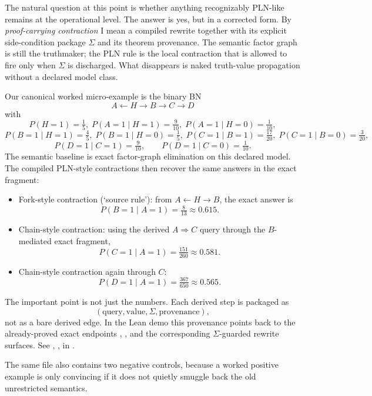 \documentclass[11pt,openany]{report}
\begin{document}
The natural question at this point is whether anything recognizably
PLN-like remains at the operational level.  The answer is yes, but in a
corrected form.  By \emph{proof-carrying contraction} I mean a compiled
rewrite together with its explicit side-condition package $\Sigma$ and
its theorem provenance.  The semantic factor graph is still the
truthmaker; the PLN rule is the local contraction that is allowed to fire
only when $\Sigma$ is discharged.  What disappears is naked truth-value
propagation without a declared model class.

Our canonical worked micro-example is the binary BN
\[
  A \leftarrow H \to B \to C \to D
\]
with
\[
  P(H{=}1)=\tfrac15,\;
  P(A{=}1 \mid H{=}1)=\tfrac9{10},\;
  P(A{=}1 \mid H{=}0)=\tfrac1{10},
\]
\[
  P(B{=}1 \mid H{=}1)=\tfrac45,\;
  P(B{=}1 \mid H{=}0)=\tfrac15,\;
  P(C{=}1 \mid B{=}1)=\tfrac{17}{20},\;
  P(C{=}1 \mid B{=}0)=\tfrac3{20},
\]
\[
  P(D{=}1 \mid C{=}1)=\tfrac9{10},\qquad
  P(D{=}1 \mid C{=}0)=\tfrac1{10}.
\]
The semantic baseline is exact factor-graph elimination on this declared
model.  The compiled PLN-style contractions then recover the same answers
in the exact fragment:
\begin{itemize}
\item Fork-style contraction (`source rule'): from $A \leftarrow H \to B$,
  the exact answer is
  \[
    P(B{=}1 \mid A{=}1)=\tfrac8{13}\approx 0.615.
  \]
\item Chain-style contraction: using the derived $A \Rightarrow C$ query
  through the $B$-mediated exact fragment,
  \[
    P(C{=}1 \mid A{=}1)=\tfrac{151}{260}\approx 0.581.
  \]
\item Chain-style contraction again through $C$:
  \[
    P(D{=}1 \mid A{=}1)=\tfrac{367}{650}\approx 0.565.
  \]
\end{itemize}

The important point is not just the numbers.  Each derived step is
packaged as
\[
  (\text{query}, \text{value}, \Sigma, \text{provenance}),
\]
not as a bare derived edge.  In the Lean demo this provenance points back
to the already-proved exact endpoints
,
, and the corresponding
$\Sigma$-guarded rewrite surfaces.  See
,
,
 in
.

The same file also contains two negative controls, because a worked
positive example is only convincing if it does not quietly smuggle back
the old unrestricted semantics.
\end{document}
